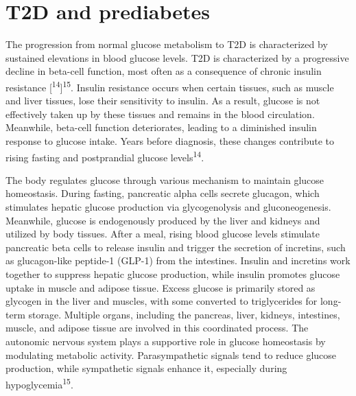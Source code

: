 \documentclass[
  a4paper,
  headsepline=true,
  open=any]{scrbook}
\begin{document}
\hypertarget{t2d-and-prediabetes}{%
\section{T2D and prediabetes}\label{t2d-and-prediabetes}}

The progression from normal glucose metabolism to T2D is characterized
by sustained elevations in blood glucose levels. T2D is characterized by
a progressive decline in beta-cell function, most often as a consequence
of chronic insulin resistance
{[}\textsuperscript{14}{]}\textsuperscript{15}. Insulin resistance
occurs when certain tissues, such as muscle and liver tissues, lose
their sensitivity to insulin. As a result, glucose is not effectively
taken up by these tissues and remains in the blood circulation.
Meanwhile, beta-cell function deteriorates, leading to a diminished
insulin response to glucose intake. Years before diagnosis, these
changes contribute to rising fasting and postprandial glucose
levels\textsuperscript{14}.

The body regulates glucose through various mechanism to maintain glucose
homeostasis. During fasting, pancreatic alpha cells secrete glucagon,
which stimulates hepatic glucose production via glycogenolysis and
gluconeogenesis. Meanwhile, glucose is endogenously produced by the
liver and kidneys and utilized by body tissues. After a meal, rising
blood glucose levels stimulate pancreatic beta cells to release insulin
and trigger the secretion of incretins, such as glucagon-like peptide-1
(GLP-1) from the intestines. Insulin and incretins work together to
suppress hepatic glucose production, while insulin promotes glucose
uptake in muscle and adipose tissue. Excess glucose is primarily stored
as glycogen in the liver and muscles, with some converted to
triglycerides for long-term storage. Multiple organs, including the
pancreas, liver, kidneys, intestines, muscle, and adipose tissue are
involved in this coordinated process. The autonomic nervous system plays
a supportive role in glucose homeostasis by modulating metabolic
activity. Parasympathetic signals tend to reduce glucose production,
while sympathetic signals enhance it, especially during
hypoglycemia\textsuperscript{15}.
\end{document}
